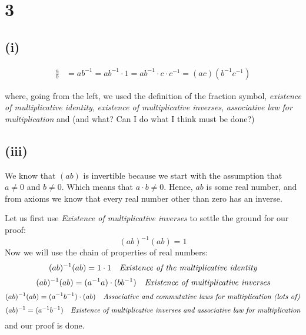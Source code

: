 \documentclass{article}
\begin{document}
\section*{3}

\subsection*{(i)}

\begin{align*}
	\frac{a}{b} &= ab^{-1} = ab^{-1} \cdot 1 = ab^{-1} \cdot c \cdot c^{-1} = (ac)(b^{-1}c^{-1})
\end{align*}

where, going from the left, we used the definition of the fraction symbol, \emph{existence of multiplicative identity},
\emph{existence of multiplicative inverses}, \emph{associative law for multiplication} and (and what? Can I do what I think must be done?)


\subsection*{(iii)}

We know that \((ab)\) is invertible because we start with the assumption that \(a \neq 0\) and \(b \neq 0\).
Which means that \(a \cdot b \neq 0\). Hence, \(ab\) is some real number, and from axioms we know that
every real number other than zero has an inverse.  

Let us first use \emph{Existence of multiplicative inverses} to settle the ground for our proof:
\begin{equation*}
	(ab)^{-1}(ab) = 1
\end{equation*}
Now we will use the chain of properties of real numbers:
\begin{equation*}
	(ab)^{-1}(ab) = 1 \cdot 1 \ \ \ \emph{Existence of the multiplicative identity}
\end{equation*}
\begin{equation*}
	(ab)^{-1}(ab) = (a^{-1}a) \cdot (bb^{-1}) \ \ \ \emph{Existence of multiplicative inverses}
\end{equation*}
\begin{equation*}
	(ab)^{-1}(ab) = (a^{-1}b^{-1}) \cdot (ab) \ \ \ \emph{Associative and commutative laws for multiplication (lots of)} 
\end{equation*}
\begin{equation*}
	(ab)^{-1} = (a^{-1}b^{-1}) \ \ \ \emph{Existence of multiplicative inverses and associative law for multiplication} 
\end{equation*}
and our proof is done.
\end{document}
